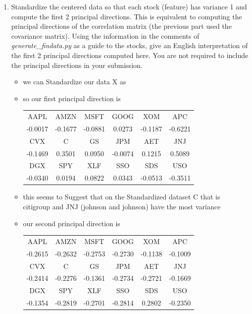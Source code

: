 \documentclass[12pt,twoside]{article}
\begin{document}
\begin{enumerate}
\begin{enumerate}
  \item Standardize the centered data so that each stock (feature) has
    variance 1 and compute the first 2 principal directions.  This is
    equivalent to computing the principal directions of the
    correlation matrix (the previous part used the covariance
    matrix).  Using the information in the comments of
   \emph{generate\_findata.py} as a guide to the stocks, 
    give an English interpretation of the first 2 principal directions
    computed here. 
    You are not required to include the principal directions in
    your submission.
    \begin{itemize}
     \color{blue}
      \item we can Standardize our data X as
      \item so our first principal direction is \begin{center}
        \begin{tabular}{c|c|c|c|c|c}
        AAPL & AMZN & MSFT & GOOG & XOM & APC\\
        -0.0017 & -0.1677 & -0.0881 & 0.0273 & -0.1187 & -0.6221\\
        \hline
        CVX & C & GS & JPM & AET & JNJ\\
        -0.1469 & 0.3501 & 0.0950 & -0.0074 & 0.1215 & 0.5089\\
        \hline
        DGX & SPY & XLF & SSO & SDS & USO\\
        -0.0340 & 0.0194 & 0.0822 & 0.0343 & -0.0513 & -0.3511\\
        \end{tabular}
        \end{center}
        \item this seems to Suggest that on the Standardized dataset C that is citigroup and JNJ (johnson and johnson) have the most variance 
      \item our second principal direction is \begin{center}
        \begin{tabular}{c|c|c|c|c|c}
        AAPL & AMZN & MSFT & GOOG & XOM & APC\\
        -0.2615 & -0.2632 & -0.2753 & -0.2730 & -0.1138 & -0.1009\\
        \hline
        CVX & C & GS & JPM & AET & JNJ\\
        -0.2414 & -0.2276 & -0.1361 & -0.2734 & -0.2721 & -0.1669\\
        \hline
        DGX & SPY & XLF & SSO & SDS & USO\\
        -0.1354 & -0.2819 & -0.2701 & -0.2814 & 0.2802 & -0.2350\\

\end{tabular}
\end{center}
\end{itemize}
\end{enumerate}
\end{enumerate}
\end{document}
